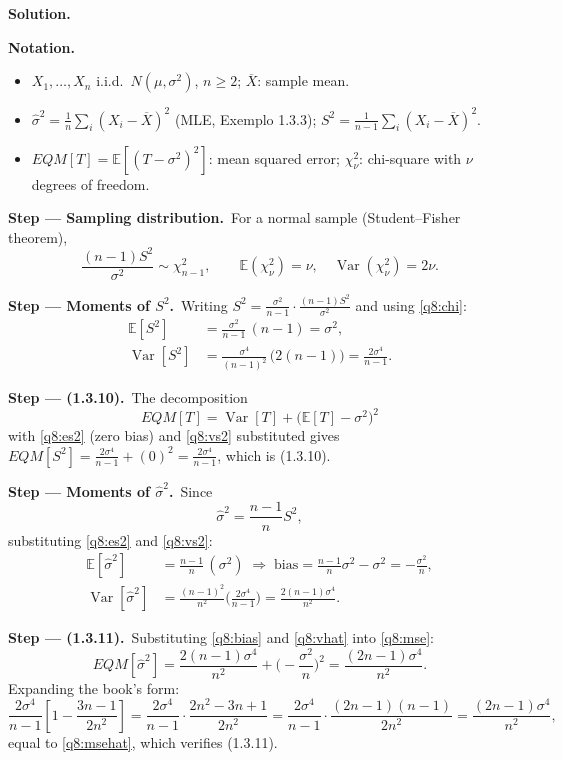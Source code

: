 \documentclass[11pt,a4paper]{article}
\numberwithin{equation}{questao}   %
\newenvironment{notacao}{\par\smallskip\noindent\textbf{Notation.}\begin{itemize}[leftmargin=1.4em,topsep=1pt,itemsep=0pt]\small}{\end{itemize}}
\newcommand{\passo}[2]{\par\smallskip\noindent\textbf{Step --- #1.}~#2}
\newcommand{\solhead}{\par\medskip\noindent{\color{blue!55!black}\rule{\linewidth}{0.3pt}}\par\noindent\textbf{Solution.}}
\newcommand{\E}{\mathbb{E}}
\newcommand{\Var}{\operatorname{Var}}
\begin{document}
\begin{sol}
\solhead
\begin{notacao}
\item $X_1,\dots,X_n$ i.i.d.\ $N(\mu,\sigma^2)$, $n\ge2$; $\overline X$: sample mean.
\item $\hat\sigma^2=\frac1n\sum_i(X_i-\overline X)^2$ (MLE, Exemplo 1.3.3); $S^2=\frac1{n-1}\sum_i(X_i-\overline X)^2$.
\item $EQM[T]=\E[(T-\sigma^2)^2]$: mean squared error; $\chi^2_\nu$: chi-square with $\nu$ degrees of freedom.
\end{notacao}

\passo{Sampling distribution}{For a normal sample (Student--Fisher theorem),}
\begin{equation}\label{q8:chi}
\frac{(n-1)S^2}{\sigma^2}\sim\chi^2_{n-1},\qquad \E(\chi^2_\nu)=\nu,\quad \Var(\chi^2_\nu)=2\nu .
\end{equation}

\passo{Moments of $S^2$}{Writing $S^2=\frac{\sigma^2}{n-1}\cdot\frac{(n-1)S^2}{\sigma^2}$ and using \eqref{q8:chi}:}
\begin{align}
\E[S^2]&=\frac{\sigma^2}{n-1}\,(n-1)=\sigma^2, \label{q8:es2}\\
\Var[S^2]&=\frac{\sigma^4}{(n-1)^2}\,\big(2(n-1)\big)=\frac{2\sigma^4}{n-1}. \label{q8:vs2}
\end{align}

\passo{(1.3.10)}{The decomposition}
\begin{equation}\label{q8:mse}
EQM[T]=\Var[T]+\big(\E[T]-\sigma^2\big)^2
\end{equation}
with \eqref{q8:es2} (zero bias) and \eqref{q8:vs2} substituted gives
$EQM[S^2]=\frac{2\sigma^4}{n-1}+(0)^2=\frac{2\sigma^4}{n-1}$, which is (1.3.10).

\passo{Moments of $\hat\sigma^2$}{Since}
\begin{equation}\label{q8:rel}
\hat\sigma^2=\frac{n-1}{n}S^2 ,
\end{equation}
substituting \eqref{q8:es2} and \eqref{q8:vs2}:
\begin{align}
\E[\hat\sigma^2]&=\frac{n-1}{n}\,(\sigma^2)\;\Longrightarrow\;\text{bias}=\frac{n-1}{n}\sigma^2-\sigma^2=-\frac{\sigma^2}{n}, \label{q8:bias}\\
\Var[\hat\sigma^2]&=\frac{(n-1)^2}{n^2}\Big(\frac{2\sigma^4}{n-1}\Big)=\frac{2(n-1)\sigma^4}{n^2}. \label{q8:vhat}
\end{align}

\passo{(1.3.11)}{Substituting \eqref{q8:bias} and \eqref{q8:vhat} into \eqref{q8:mse}:}
\begin{equation}\label{q8:msehat}
EQM[\hat\sigma^2]=\frac{2(n-1)\sigma^4}{n^2}+\Big(-\frac{\sigma^2}{n}\Big)^2=\frac{(2n-1)\sigma^4}{n^2}.
\end{equation}
Expanding the book's form:
\[
\frac{2\sigma^4}{n-1}\left[1-\frac{3n-1}{2n^2}\right]=\frac{2\sigma^4}{n-1}\cdot\frac{2n^2-3n+1}{2n^2}
=\frac{2\sigma^4}{n-1}\cdot\frac{(2n-1)(n-1)}{2n^2}=\frac{(2n-1)\sigma^4}{n^2},
\]
equal to \eqref{q8:msehat}, which verifies (1.3.11).


\end{sol}
\end{document}
